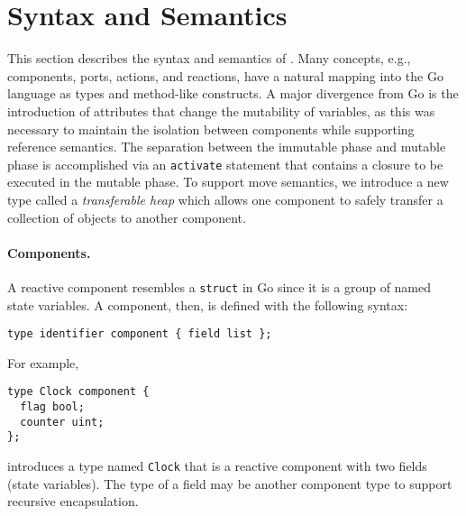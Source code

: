 
\section{Syntax and Semantics}

This section describes the syntax and semantics of \rcgo{}.
Many concepts, e.g., components, ports, actions, and reactions, have a natural mapping into the Go language as types and method-like constructs.
A major divergence from Go is the introduction of attributes that change the mutability of variables, as this was necessary to maintain the isolation between components while supporting reference semantics.
The separation between the immutable phase and mutable phase is accomplished via an \verb+activate+ statement that contains a closure to be executed in the mutable phase.
To support move semantics, we introduce a new type called a \emph{transferable heap} which allows one component to safely transfer a collection of objects to another component.

\paragraph{Components.}
A reactive component resembles a \verb+struct+ in Go since it is a group of named state variables.
A component, then, is defined with the following syntax:
\begin{verbatim}
type identifier component { field list };
\end{verbatim}
For example,
\begin{verbatim}
type Clock component {
  flag bool;
  counter uint;
};
\end{verbatim}
introduces a type named \verb+Clock+ that is a reactive component with two fields (state variables).
The type of a field may be another component type to support recursive encapsulation.

